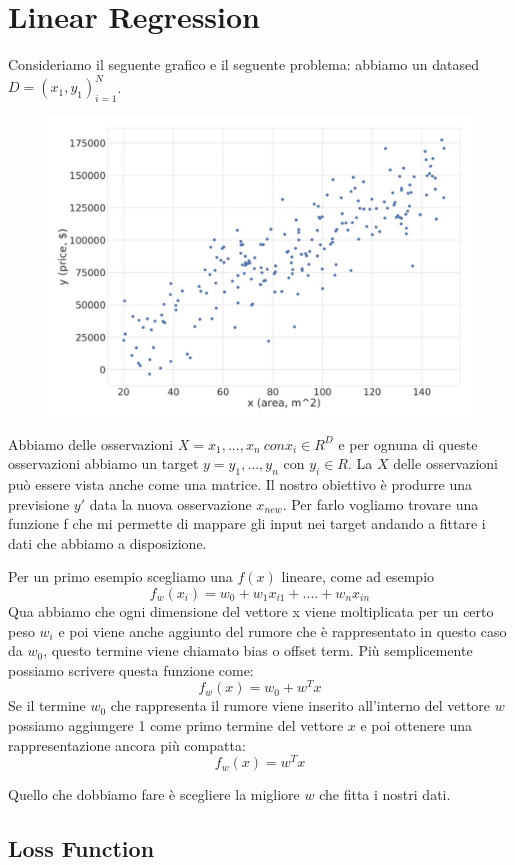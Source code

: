\documentclass[14pt]{extreport}
\begin{document}
\chapter{Linear Regression}

Consideriamo il seguente grafico e il seguente problema: abbiamo un datased $D={(x_1,y_1)}_{i=1}^N$.

\begin{figure}[H]
	\centering
	\includegraphics[width=0.7\linewidth]{64.jpeg}
\end{figure}

Abbiamo delle osservazioni $X = {x_1,...,x_n} \ con x_i \in R^D$ e per ognuna di queste osservazioni abbiamo un target $y = {y_1, ..., y_n}$ con $y_i
	\in R$. La $X$ delle osservazioni può essere vista anche come una matrice. Il nostro obiettivo è produrre una previsione $y'$ data la nuova
	osservazione $x_{new}$. Per farlo vogliamo trovare una funzione f che mi permette di mappare gli input nei target andando a fittare i dati che
	abbiamo a disposizione.

Per un primo esempio scegliamo una $f(x)$ lineare, come ad esempio $$f_w(x_i) = w_0 + w_1x_{i1} + .... + w_nx_{in}$$ Qua abbiamo che ogni dimensione
del vettore x viene moltiplicata per un certo peso $w_i$ e poi viene anche aggiunto del rumore che è rappresentato in questo caso da $w_0$, questo
termine viene chiamato bias o offset term. Più semplicemente possiamo scrivere questa funzione come:
$$f_w(x) = w_0 + w^Tx$$ Se il termine $w_0$ che rappresenta il rumore viene inserito all'interno del vettore $w$ possiamo aggiungere 1 come primo
termine del vettore $x$ e poi ottenere una rappresentazione ancora più compatta: $$f_w(x) = w^Tx$$

Quello che dobbiamo fare è scegliere la migliore $w$ che fitta i nostri dati.

\section{Loss Function}
\end{document}
